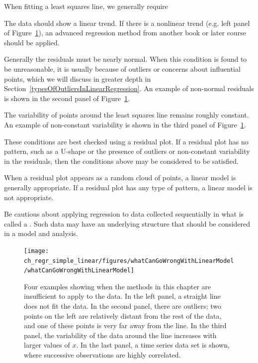 When fitting a least squares line, we generally require
\begin{description}
\setlength{\itemsep}{0mm}
\item[Linearity.] The data should show a linear trend.  If there is a nonlinear trend (e.g. left panel of Figure~\ref{whatCanGoWrongWithLinearModel}), an advanced regression method from another book or later course should be applied.
\item[Nearly normal residuals.] Generally the residuals must be nearly normal.
When this condition is found to be unreasonable, it is usually because of outliers or concerns about influential points, which we  will discuss in greater depth in Section~\ref{typesOfOutliersInLinearRegression}. An example of non-normal residuals is shown in the second panel of Figure~\ref{whatCanGoWrongWithLinearModel}.
\item[Constant variability.] The variability of points around the least squares line remains roughly constant. An example of non-constant variability is shown in the third panel of Figure~\ref{whatCanGoWrongWithLinearModel}.
\end{description}

These conditions are best checked using a residual plot.  If a residual plot has no pattern, such as a U-shape or the presence of outliers or non-constant variability in the residuals, then the conditions above may be considered to be satisfied.

\begin{tipBox}{
When a residual plot appears as a random cloud of points, a linear model is generally appropriate. If a residual plot has any type of pattern, a linear model is not appropriate.  
}
\end{tipBox} 



Be cautious about applying regression to data collected sequentially in what is called a . Such data may have an underlying structure that should be considered in a model and analysis.

\begin{figure}
\centering
\texttt{[image: ch\_regr\_simple\_linear/figures/whatCanGoWrongWithLinearModel/whatCanGoWrongWithLinearModel]}
\caption{Four examples showing when the methods in this chapter are insufficient to apply to the data. In the left panel, a straight line does not fit the data. In the second panel, there are outliers; two points on the left are relatively distant from the rest of the data, and one of these points is very far away from the line. In the third panel, the variability of the data around the line increases with larger values of $x$. In the last panel, a time series data set is shown, where successive observations are highly correlated.}
\label{whatCanGoWrongWithLinearModel}
\end{figure}


